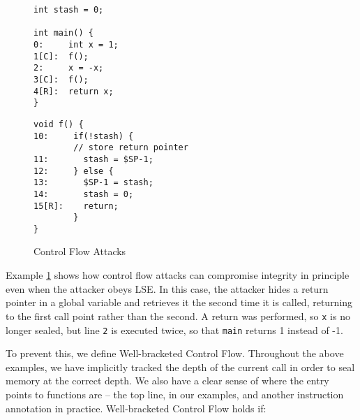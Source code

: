 \documentclass[acmsmall,review,anonymous]{acmart}\settopmatter{printfolios=true,printccs=false,printacmref=false}
\begin{document}
\begin{figure}
  \centering
  \begin{minipage}{.4\textwidth}
\begin{verbatim}
int stash = 0;

int main() {
0:     int x = 1;
1[C]:  f();
2:     x = -x;
3[C]:  f();
4[R]:  return x;
}
\end{verbatim}
  \end{minipage}
  \begin{minipage}{.4\textwidth}
\begin{verbatim}
void f() {
10:     if(!stash) {
        // store return pointer
11:       stash = $SP-1;
12:     } else {
13:       $SP-1 = stash;
14:       stash = 0;
15[R]:    return;
        }
}
\end{verbatim}
  \end{minipage}
\label{fig:WBCF1}
%
%
  \caption{Control Flow Attacks}
  \label{fig:WBCF}
\end{figure}

Example \ref{fig:WBCF} shows how control flow attacks can compromise integrity in principle
even when the attacker obeys LSE. In this case, the attacker hides a return pointer in a
global variable and retrieves it the second time it is called, returning to the first call
point rather than the second. A return was performed, so {\tt x} is no longer sealed, but
line {\tt 2} is executed twice, so that {\tt main} returns 1 instead of -1.

To prevent this, we define Well-bracketed Control Flow. Throughout the above examples, we
have implicitly tracked the depth of the current call in order to seal memory at the correct
depth. We also have a clear sense of where the entry points to functions are -- the top line,
in our examples, and another instruction annotation in practice. Well-bracketed Control Flow
holds if:
\end{document}
